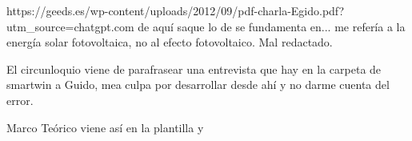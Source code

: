 https://geeds.es/wp-content/uploads/2012/09/pdf-charla-Egido.pdf?utm_source=chatgpt.com de aquí saque lo de se fundamenta en... me refería a la energía solar fotovoltaica, no al efecto fotovoltaico. Mal redactado.

El circunloquio viene de parafrasear una entrevista que hay en la carpeta de smartwin a Guido, mea culpa por desarrollar desde ahí y no darme cuenta del error.

Marco Teórico viene así en la plantilla y 